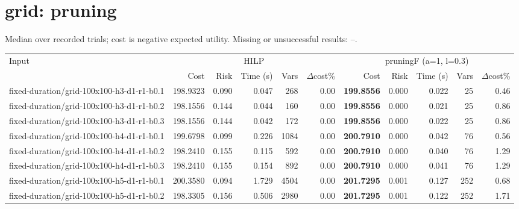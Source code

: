 \documentclass[10pt]{article}
\begin{document}
\section*{grid: pruning}
\noindent Median over recorded trials; cost is negative expected utility. Missing or unsuccessful results: --.\par
\small\begin{tabular}{p{65mm}rrrrrrrrrr}
\toprule
Input & \multicolumn{5}{c}{HILP} & \multicolumn{5}{c}{pruningF (a=1, l=0.3)} \\
 & Cost & Risk & Time (s) & Vars & $\Delta$cost\% & Cost & Risk & Time (s) & Vars & $\Delta$cost\% \\
\midrule
fixed-\allowbreak duration/\allowbreak grid-\allowbreak 100x100-\allowbreak h3-\allowbreak d1-\allowbreak r1-\allowbreak b0.1 & 198.9323 & 0.090 & 0.047 & 268 & 0.00 & \textbf{199.8556} & 0.000 & 0.022 & 25 & 0.46 \\
fixed-\allowbreak duration/\allowbreak grid-\allowbreak 100x100-\allowbreak h3-\allowbreak d1-\allowbreak r1-\allowbreak b0.2 & 198.1556 & 0.144 & 0.044 & 160 & 0.00 & \textbf{199.8556} & 0.000 & 0.021 & 25 & 0.86 \\
fixed-\allowbreak duration/\allowbreak grid-\allowbreak 100x100-\allowbreak h3-\allowbreak d1-\allowbreak r1-\allowbreak b0.3 & 198.1556 & 0.144 & 0.042 & 172 & 0.00 & \textbf{199.8556} & 0.000 & 0.022 & 25 & 0.86 \\
fixed-\allowbreak duration/\allowbreak grid-\allowbreak 100x100-\allowbreak h4-\allowbreak d1-\allowbreak r1-\allowbreak b0.1 & 199.6798 & 0.099 & 0.226 & 1084 & 0.00 & \textbf{200.7910} & 0.000 & 0.042 & 76 & 0.56 \\
fixed-\allowbreak duration/\allowbreak grid-\allowbreak 100x100-\allowbreak h4-\allowbreak d1-\allowbreak r1-\allowbreak b0.2 & 198.2410 & 0.155 & 0.115 & 592 & 0.00 & \textbf{200.7910} & 0.000 & 0.040 & 76 & 1.29 \\
fixed-\allowbreak duration/\allowbreak grid-\allowbreak 100x100-\allowbreak h4-\allowbreak d1-\allowbreak r1-\allowbreak b0.3 & 198.2410 & 0.155 & 0.154 & 892 & 0.00 & \textbf{200.7910} & 0.000 & 0.041 & 76 & 1.29 \\
fixed-\allowbreak duration/\allowbreak grid-\allowbreak 100x100-\allowbreak h5-\allowbreak d1-\allowbreak r1-\allowbreak b0.1 & 200.3580 & 0.094 & 1.729 & 4504 & 0.00 & \textbf{201.7295} & 0.001 & 0.127 & 252 & 0.68 \\
fixed-\allowbreak duration/\allowbreak grid-\allowbreak 100x100-\allowbreak h5-\allowbreak d1-\allowbreak r1-\allowbreak b0.2 & 198.3305 & 0.156 & 0.506 & 2980 & 0.00 & \textbf{201.7295} & 0.001 & 0.122 & 252 & 1.71 \\

\end{tabular}
\end{document}
